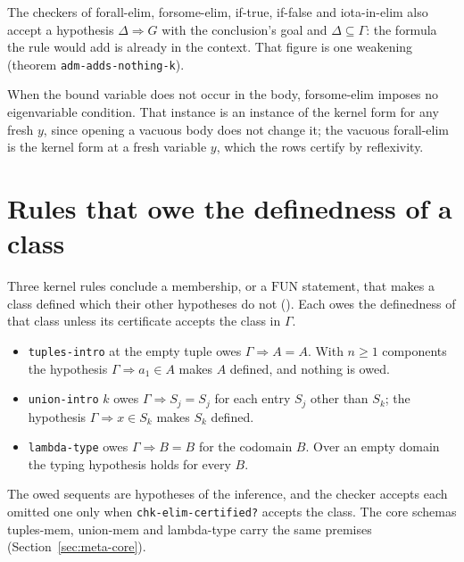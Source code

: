 The checkers of forall-elim, forsome-elim, if-true, if-false and
iota-in-elim also accept a hypothesis $\Delta \Longrightarrow G$ with the
conclusion's goal and $\Delta \subseteq \Gamma$: the formula the rule
would add is already in the context.  That figure is one weakening
(theorem \texttt{adm-adds-nothing-k}).

When the bound variable does not occur in the body, forsome-elim imposes
no eigenvariable condition.  That instance is an instance of the kernel
form for any fresh $y$, since opening a vacuous body does not change it;
the vacuous forall-elim is the kernel form at a fresh variable $y$, which
the rows certify by reflexivity.

\section{Rules that owe the definedness of a class}\label{sec:meta-owed}

Three kernel rules conclude a membership, or a $\mathrm{FUN}$ statement,
that makes a class defined which their other hypotheses do not
().  Each owes the definedness of that class unless its
certificate accepts the class in $\Gamma$.
\begin{itemize}
\item \texttt{tuples-intro} at the empty tuple owes
  $\Gamma \Longrightarrow A = A$.  With $n \geq 1$ components the
  hypothesis $\Gamma \Longrightarrow a_1 \in A$ makes $A$ defined, and
  nothing is owed.
\item \texttt{union-intro} $k$ owes $\Gamma \Longrightarrow S_j = S_j$ for
  each entry $S_j$ other than $S_k$; the hypothesis
  $\Gamma \Longrightarrow x \in S_k$ makes $S_k$ defined.
\item \texttt{lambda-type} owes $\Gamma \Longrightarrow B = B$ for the
  codomain $B$.  Over an empty domain the typing hypothesis holds for
  every $B$.
\end{itemize}
The owed sequents are hypotheses of the inference, and the checker
accepts each omitted one only when \texttt{chk-elim-certified?} accepts
the class.  The core schemas tuples-mem, union-mem and lambda-type carry
the same premises (Section~\ref{sec:meta-core}).

